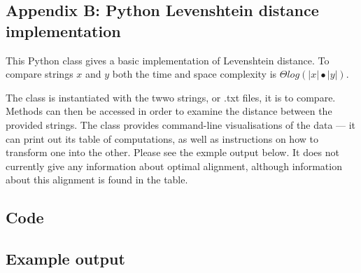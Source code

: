 \documentclass[a4paper,11pt,twoside,notitlepage]{article}
\begin{document}
\begin{appendices}
          \section{Appendix B: Python Levenshtein distance implementation}
          \label{levenshtein-implement}
          This Python class gives a basic implementation of
          Levenshtein distance. To compare strings $x$ and $y$ both
          the time and space complexity is
          ${\Theta}log(|x|{\bullet}|y|)$.

          The class is instantiated with the twwo strings, or .txt
          files, it is to compare. Methods can then be accessed in
          order to examine the distance between the provided
          strings. The class provides command-line visualisations of
          the data --- it can print out its table of computations, as
          well as instructions on how to transform one into the
          other. Please see the exmple output below. It does not
          currently give any information about optimal alignment,
          although information about this alignment is found in the
          table.
          \subsection{Code}
          
          \subsection{Example output}
        \end{appendices}
        
\end{document}
